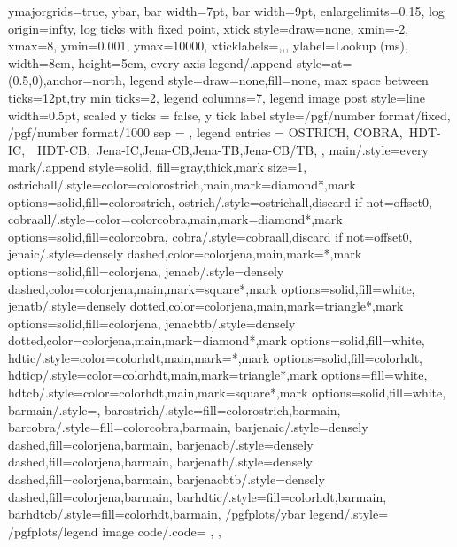 {{      ymajorgrids=true,
      ybar,
      bar width=7pt,
      bar width=9pt,
      enlargelimits=0.15,
      log origin=infty,
      log ticks with fixed point,
      xtick style={draw=none},
      xmin=-2,
      xmax=8,
      ymin=0.001,
      ymax=10000,
      xticklabels={,,},
      ylabel={Lookup (ms)},
      width=8cm,
      height=5cm,
      every axis legend/.append style={at={(0.5,0)},anchor=north},
      legend style={draw=none,fill=none},
      max space between ticks=12pt,try min ticks=2,
      legend columns=7,
      legend image post style={line width=0.5pt},
      scaled y ticks = false,
      y tick label style={/pgf/number format/fixed, /pgf/number format/1000 sep = \thinspace},
      legend entries = {OSTRICH, COBRA,\ HDT-IC,\ \ HDT-CB,\ Jena-IC,Jena-CB,Jena-TB,Jena-CB/TB,}
  },
  main/.style={every mark/.append style={solid, fill=gray},thick,mark size=1},
  ostrichall/.style={color=colorostrich,main,mark=diamond*,mark options={solid,fill=colorostrich}},
  ostrich/.style={ostrichall,discard if not={offset}{0}},
  cobraall/.style={color=colorcobra,main,mark=diamond*,mark options={solid,fill=colorcobra}},
  cobra/.style={cobraall,discard if not={offset}{0}},
  jenaic/.style={densely dashed,color=colorjena,main,mark=*,mark options={solid,fill=colorjena}},
  jenacb/.style={densely dashed,color=colorjena,main,mark=square*,mark options={solid,fill=white}},
  jenatb/.style={densely dotted,color=colorjena,main,mark=triangle*,mark options={solid,fill=colorjena}},
  jenacbtb/.style={densely dotted,color=colorjena,main,mark=diamond*,mark options={solid,fill=white}},
  hdtic/.style={color=colorhdt,main,mark=*,mark options={solid,fill=colorhdt}},
  hdticp/.style={color=colorhdt,main,mark=triangle*,mark options={fill=white}},
  hdtcb/.style={color=colorhdt,main,mark=square*,mark options={solid,fill=white}},
  barmain/.style={},
  barostrich/.style={fill=colorostrich,barmain},
  barcobra/.style={fill=colorcobra,barmain},
  barjenaic/.style={densely dashed,fill=colorjena,barmain},
  barjenacb/.style={densely dashed,fill=colorjena,barmain},
  barjenatb/.style={densely dashed,fill=colorjena,barmain},
  barjenacbtb/.style={densely dashed,fill=colorjena,barmain},
  barhdtic/.style={fill=colorhdt,barmain},
  barhdtcb/.style={fill=colorhdt,barmain},
  /pgfplots/ybar legend/.style={
      /pgfplots/legend image code/.code={%
         },
  },
}
